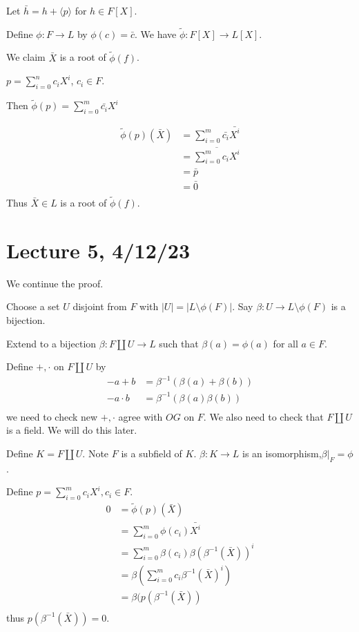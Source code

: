\documentclass[x11names,reqno,14pt]{extarticle}
\begin{document}
Let $\bar{h} = h + \langle p \rangle$ for $h \in F[X]$. 

Define $\phi:F\to L$ by $\phi(c) = \bar{c}$. We have $\tilde{\phi}:F[X]\to L[X]$. 

We claim $\bar{X}$ is a root of $\tilde{\phi}(f)$.

$p = \sum_{i=0}^n c_i X^i$, $c_i \in F$. 

Then $\tilde{\phi}(p) = \sum_{i=0}^m\bar{c_i}X^i$

\begin{align*}
\tilde{\phi}(p)(\bar{X}) & = \sum_{i=0}^m\bar{c_i}\bar{X^i} \\
								& = \overline{\sum_{i=0}^m c_i X^i}\\
								& = \bar{p} \\ & = \bar{0} \\
\end{align*}
Thus $\bar{X} \in L$ is a root of $\tilde{\phi}(f)$.

\section*{Lecture 5, 4/12/23}

We continue the proof. 

Choose a set $U$ disjoint from $F$ with $|U| = |L\setminus\phi(F)|$. Say $\beta:U\to L\setminus\phi(F)$ is a bijection. 

Extend to a bijection $\beta:F\coprod U \to L$ such that $\beta(a) = \phi(a)$ for all $a \in F$. 

Define $+,\cdot$ on $F \coprod U$ by 
\begin{align*}
- a + b & = \beta^{-1}(\beta(a) + \beta(b)) \\
-a\cdot b & = \beta^{-1}(\beta(a)\beta(b)) \\
\end{align*}
we need to check new $+,\cdot$ agree with $OG$ on $F$. We also need to check that $F \coprod U$ is a field. We will do this later. 

Define $K = F \coprod U$. Note $F$ is a subfield of $K$. $\beta:K\to L$ is an isomorphism,$\beta|_F = \phi$. 

Define $p = \sum_{i=0}^mc_iX^i, c_i \in F$. 
\begin{align*}
0 & = \tilde{\phi}(p)(\bar{X}) \\
& = \sum_{i=0}^m\phi(c_i)\bar{X^i} \\
& = \sum_{i=0}^m\beta(c_i)\beta(\beta^{-1}(\bar{X}))^i \\
& = \beta\left(\sum_{i=0}^mc_i\beta^{-1}(\bar{X})^i\right)\\
& = \beta(p(\beta^{-1}(\bar{X})) \\
\end{align*}
thus $p(\beta^{-1}(\bar{X})) = 0$. 
\end{document}
